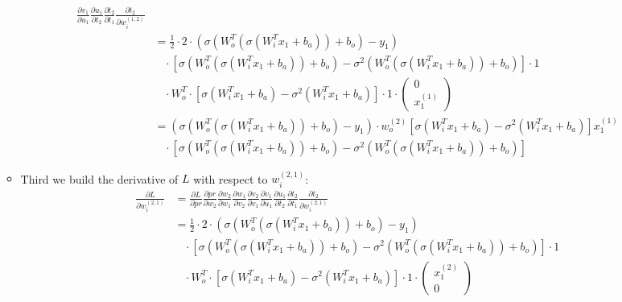 \documentclass[a4paper]{article}
\begin{document}
\begin{itemize}
\begin{itemize}
\begin{align*}
                            \frac{\partial v_1}{\partial u_1} \frac{\partial u_1}{\partial t_2} \frac{\partial t_2}{\partial t_1} \frac{\partial t_2}{\partial w_i^{(1,2)}}\\
                            &= \frac{1}{2} \cdot 2 \cdot (\sigma(W_o^T(\sigma(W_i^T x_1 + b_a)) + b_o) - y_1)\\
                            &\ \ \ \ \cdot [\sigma(W_o^T(\sigma(W_i^T x_1 + b_a)) + b_o) - \sigma^2(W_o^T(\sigma(W_i^T x_1 + b_a)) + b_o)] \cdot 1\\
                            &\ \ \ \ \cdot W_o^T \cdot [\sigma(W_i^T x_1 + b_a) - \sigma^2(W_i^T x_1 + b_a)] \cdot 1 
                            \cdot \left(\begin{matrix} 0 \\ x_1^{(1)} \end{matrix} \right)\\
                            &= (\sigma(W_o^T(\sigma(W_i^T x_1 + b_a)) + b_o) - y_1) \cdot w_o^{(2)} [\sigma(W_i^T x_1 + b_a) - \sigma^2(W_i^T x_1 + b_a)] x_1^{(1)}\\
                            &\ \ \ \ \cdot [\sigma(W_o^T(\sigma(W_i^T x_1 + b_a)) + b_o) - \sigma^2(W_o^T(\sigma(W_i^T x_1 + b_a)) + b_o)]
                        \end{align*}
                    \item Third we build the derivative of $L$ with respect to $w_i^{(2,1)}$:
                        \begin{align*}
                            \frac{\partial L}{\partial w_i^{(2,1)}} &= \frac{\partial L}{\partial pr} \frac{\partial pr}{\partial w_2} 
                            \frac{\partial w_2}{\partial w_1} \frac{\partial w_1}{\partial v_2} \frac{\partial v_2}{\partial v_1}
                            \frac{\partial v_1}{\partial u_1} \frac{\partial u_1}{\partial t_2} \frac{\partial t_2}{\partial t_1} \frac{\partial t_2}{\partial w_i^{(2,1)}}\\
                            &= \frac{1}{2} \cdot 2 \cdot (\sigma(W_o^T(\sigma(W_i^T x_1 + b_a)) + b_o) - y_1)\\
                            &\ \ \ \ \cdot [\sigma(W_o^T(\sigma(W_i^T x_1 + b_a)) + b_o) - \sigma^2(W_o^T(\sigma(W_i^T x_1 + b_a)) + b_o)] \cdot 1\\
                            &\ \ \ \ \cdot W_o^T \cdot [\sigma(W_i^T x_1 + b_a) - \sigma^2(W_i^T x_1 + b_a)] \cdot 1 
                            \cdot \left( \begin{matrix} x_1^{(2)} \\ 0 \end{matrix} \right)\\

\end{align*}
\end{itemize}
\end{itemize}
\end{document}
